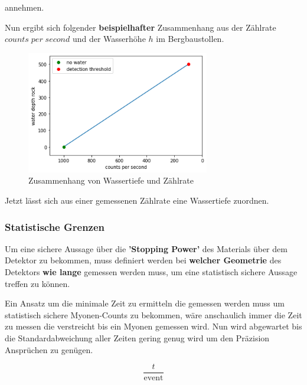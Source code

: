 annehmen.

Nun ergibt sich folgender \textbf{beispielhafter} Zusammenhang 
aus der Zählrate 
$counts \;per \;second$ und der Wasserhöhe $h$ im Bergbaustollen.

\begin{figure}[h]
    \centering
    \includegraphics[width=8cm]{plots/rate_plot_example.png}
    \caption{Zusammenhang von Wassertiefe und Zählrate}
    \label{fig:my_label}
\end{figure}

Jetzt lässt sich aus einer gemessenen Zählrate eine Wassertiefe zuordnen.

\subsubsection{Statistische Grenzen}

Um eine sichere Aussage über die \textbf{'Stopping Power'} des Materials über dem Detektor zu bekommen, muss definiert werden bei \textbf{welcher Geometrie} des Detektors \textbf{wie lange} gemessen werden muss, um eine statistisch sichere Aussage treffen zu können.

Ein Ansatz um die minimale Zeit zu ermitteln die gemessen werden muss um statistisch sichere Myonen-Counts zu bekommen, wäre anschaulich immer die Zeit zu messen die verstreicht bis ein Myonen gemessen wird. 
Nun wird abgewartet bis die Standardabweichung aller Zeiten gering genug wird um den Präzision Ansprüchen zu genügen.

\begin{equation}
    \frac{t}{\text{event}}
\end{equation}
